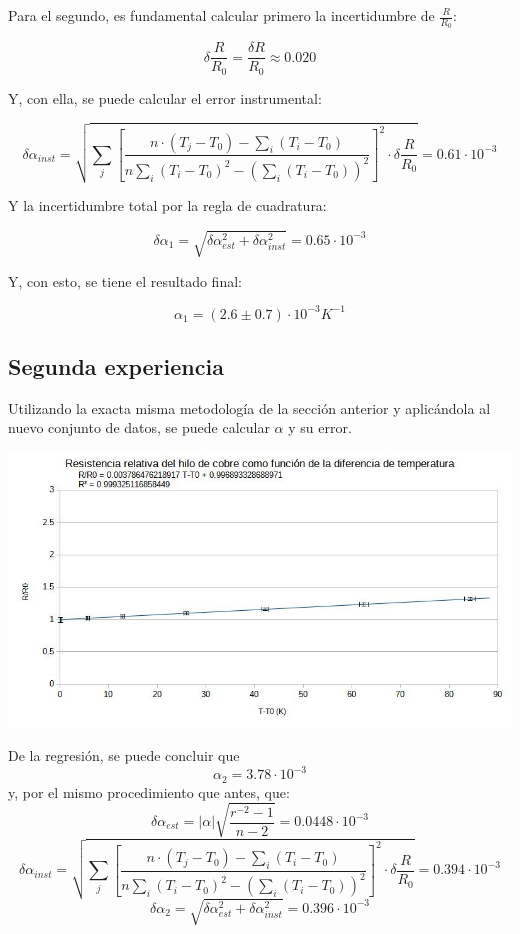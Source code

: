 \documentclass[a4paper,12pt]{article}
\begin{document}
Para el segundo, es fundamental calcular primero la incertidumbre de $\frac{R}{R_0}$:

$$\delta \frac{R}{R_0} = \frac{\delta R}{R_0} \approx 0.020$$

Y, con ella, se puede calcular el error instrumental:

$$\delta\alpha_{inst} = \sqrt{\sum_j\left[ \frac{n\cdot(T_j-T_0)-\sum_i (T_i-T_0)}{n\sum_i (T_i-T_0)^2-\left(  \sum_i (T_i-T_0)\right)^2} \right]^2\cdot\delta\frac{R}{R_0}} = 0.61 \cdot 10^{-3}$$

Y la incertidumbre total por la regla de cuadratura:

$$\delta\alpha_1 = \sqrt{\delta\alpha_{est}^2+\delta\alpha_{inst}^2} = 0.65 \cdot 10^{-3} $$

Y, con esto, se tiene el resultado final:
\begin{tcolorbox}
    \begin{equation}
        \alpha_1 = (2.6 \pm 0.7) \cdot 10^{-3} K^{-1}
    \end{equation}
\end{tcolorbox}
\subsection{Segunda experiencia}
Utilizando la exacta misma metodología de la sección anterior y aplicándola al nuevo conjunto de datos, se puede calcular $\alpha$ y su error. 

\includegraphics[width=\textwidth]{Exp1_GRegr2.jpg} 

De la regresión, se puede concluir que 
$$\alpha_2 =3.78 \cdot 10^{-3}$$
y, por el mismo procedimiento que antes, que:
$$\delta\alpha_{est} = |\alpha|\sqrt{\frac{r^{-2}-1}{n-2}} = 0.0448\cdot 10^{-3}$$
$$\delta\alpha_{inst} = \sqrt{\sum_j\left[ \frac{n\cdot(T_j-T_0)-\sum_i (T_i-T_0)}{n\sum_i (T_i-T_0)^2-\left(  \sum_i (T_i-T_0)\right)^2} \right]^2\cdot\delta\frac{R}{R_0}} =0.394 \cdot 10^{-3}$$
$$\delta\alpha_2 = \sqrt{\delta\alpha_{est}^2+\delta\alpha_{inst}^2} = 0.396\cdot 10^{-3} $$
\end{document}
